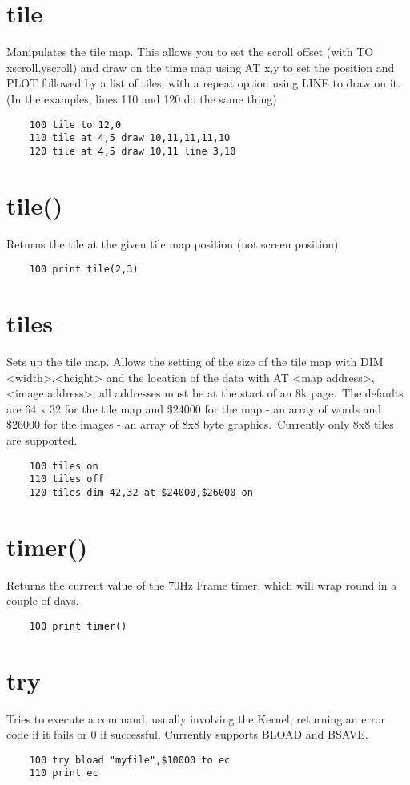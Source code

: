 \section*{tile}
Manipulates the tile map. This allows you to set the scroll offset (with TO xscroll,yscroll) and draw on the time map using AT x,y to set the position and PLOT followed by a list of tiles, with a repeat option using LINE to draw on it. (In the examples, lines 110 and 120 do the same thing)
\example{}
\begin{verbatim}
	100 tile to 12,0
	110 tile at 4,5 draw 10,11,11,11,10
	120 tile at 4,5 draw 10,11 line 3,10
\end{verbatim}

\section*{tile()}
Returns the tile at the given tile map position (not screen position)
\example{}
\begin{verbatim}
	100 print tile(2,3)
\end{verbatim}

\section*{tiles}
Sets up the tile map. Allows the setting of the size of the tile map with DIM <width>,<height> and the location of the data with AT <map address>,<image address>, all addresses must be at the start of an 8k page.\
The defaults are 64 x 32 for the tile map and \$24000 for the map - an array of words and \$26000 for the images - an array of 8x8 byte graphics.\
Currently only 8x8 tiles are supported. 
\example{}
\begin{verbatim}
	100 tiles on
	110 tiles off
	120 tiles dim 42,32 at $24000,$26000 on
\end{verbatim}

\section*{timer()}
Returns the current value of the 70Hz Frame timer, which will wrap round in a couple of days.
\example{}
\begin{verbatim}
	100 print timer()
\end{verbatim}

\section*{try}
Tries to execute a command, usually involving the Kernel, returning an error code if it fails or 0 if successful. Currently supports BLOAD and BSAVE.
\example{}
\begin{verbatim}
	100 try bload "myfile",$10000 to ec
	110 print ec
\end{verbatim}

